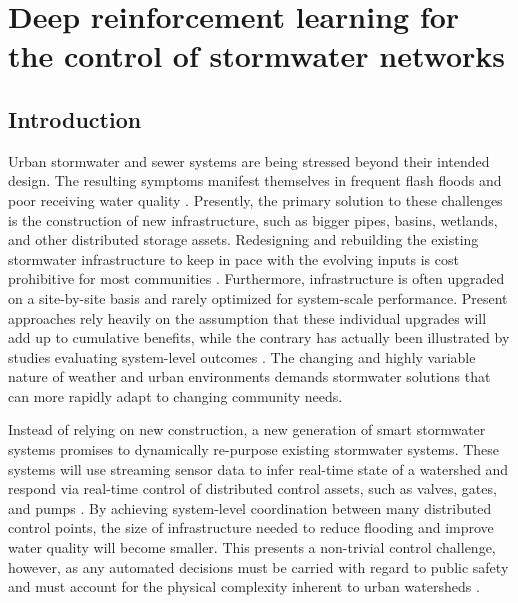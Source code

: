 \chapter{Deep reinforcement learning for the control of stormwater networks}\label{ch:rl}

\section{Introduction}
Urban stormwater and sewer systems are being stressed beyond their intended design.
The resulting symptoms manifest themselves in frequent flash floods \cite{LarisKarklisBefore-and-afterPost} and poor receiving water quality \cite{Watson2016TheHypoxia}.
Presently, the primary solution to these challenges is the construction of new infrastructure, such as bigger pipes, basins, wetlands, and other distributed storage assets.
Redesigning and rebuilding the existing stormwater infrastructure to keep in pace with the evolving inputs is cost prohibitive for most communities \cite{Kerkez2016}.
Furthermore, infrastructure is often upgraded on a site-by-site basis and rarely optimized for system-scale performance.
Present approaches rely heavily on the assumption that these individual upgrades will add up to cumulative benefits, while the contrary has actually been illustrated by studies evaluating system-level outcomes \cite{Emerson2005Watershed-ScaleBasins}.
The changing and highly variable nature of weather and urban environments demands stormwater solutions that can more rapidly adapt to changing community needs.


Instead of relying on new construction, a new generation of smart stormwater systems promises to dynamically re-purpose existing stormwater systems.
These systems will use streaming sensor data to infer real-time state of a watershed and respond via real-time control of distributed control assets, such as valves, gates, and pumps \cite{Kerkez2016}.
By achieving system-level coordination between many distributed control points, the size of infrastructure needed to reduce flooding and improve water quality will become smaller.
This presents a non-trivial control challenge, however, as any automated decisions must be carried with regard to public safety and must account for the physical complexity inherent to urban watersheds \cite{Mullapudi2017, Schutze2004RealToday}.


